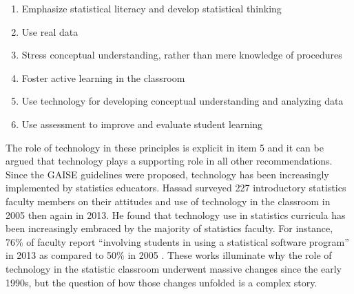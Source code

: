 \begin{enumerate}
\item Emphasize statistical literacy and develop statistical thinking
\item Use real data
\item Stress conceptual understanding, rather than mere knowledge of procedures
\item Foster active learning in the classroom 
\item Use technology for developing conceptual understanding and analyzing data
\item Use assessment to improve and evaluate student learning
\end{enumerate}

The role of technology in these principles is explicit in item 5 and it can be argued that technology plays a supporting role in all other recommendations. Since the GAISE guidelines were proposed, technology has been increasingly implemented by statistics educators. Hassad surveyed 227 introductory statistics faculty members on their attitudes and use of technology in the classroom in 2005 then again in 2013. He found that technology use in statistics curricula has been increasingly embraced by the majority of statistics faculty. For instance, 76\% of faculty report ``involving students in using a statistical software program'' in 2013 as compared to 50\% in 2005 \citep{Hassad2013}. These works illuminate why the role of technology in the statistic classroom underwent massive changes since the early 1990s, but the question of how those changes unfolded is a complex story.

